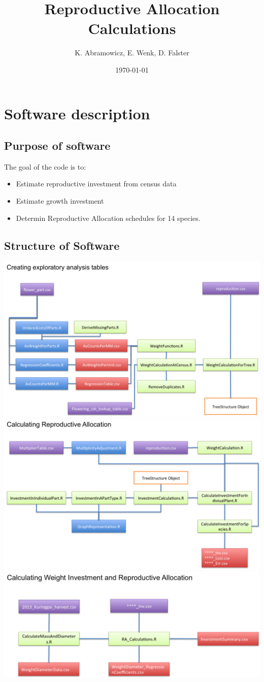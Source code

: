 \documentclass[10pt]{book} %
\title{Reproductive Allocation Calculations}
\author{K. Abramowicz, E. Wenk, D. Falster}
\date{\today}
\begin{document}
\maketitle
\chapter{Software description}
\section{Purpose of software}
The goal of the code is to:
\begin{itemize}
\item Estimate reproductive investment from census data
\item Estimate growth investment
\item Determin Reproductive Allocation schedules for 14 species.
\end{itemize}
\section{Structure of Software}
\begin{center}
\includegraphics[width=0.75\linewidth]{Flow1.png}\\
\includegraphics[width=0.75\linewidth]{Flow2.png}\\
\includegraphics[width=0.75\linewidth]{Flow3.png}
\end{center}
\end{document}
